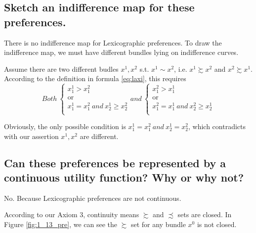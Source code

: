 \documentclass{article}
\begin{document}
\subsection{Sketch an indifference map for these preferences.}
There is no indifference map for Lexicographic preferences. To draw the indifference map,
we must have different bundles lying on indifference curves.

Assume there are two different budles $x^1, x^2$ s.t. $x^1 \sim x^2$, i.e. $x^1 \succsim x^2$
and $x^2 \succsim x^1$. According to the definition in formula \ref{eq:laxi}, this requires
\begin{equation}
    Both \
    \begin{cases}
      \text{$x^1_1 > x^2_1$}\\
      \text{or}\\
      \text{$x^1_1 = x^2_1 \ and \ x^1_2 \ge x^2_2$}\\
    \end{cases}
    and \ 
    \begin{cases}
      \text{$x^2_1 > x^1_1$}\\
      \text{or}\\
      \text{$x^2_1 = x^1_1 \ and \ x^2_2 \ge x^1_2$}\\
    \end{cases}
    \label{eq:nomap}       
\end{equation}

Obviously, the only possible condition is $x^1_1 = x^2_1 \ and \ x^1_2 = x^2_2$, which contradicts
with our assertion $x^1, x^2$ are different.

\subsection{Can these preferences be represented by a continuous utility function? Why or why not?}

No. Because Lexicographic preferences are not continuous. 

According to our Axiom 3, continuity means $\succsim$ and $\precsim$ sets are closed. 
In Figure \ref{fig:1_13_pre}, we can see the $\succsim$ set for any bundle $x^0$ is not closed.

{\centering
{}
\label{fig:1_13_pre}}
\end{document}
